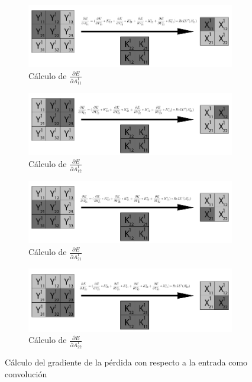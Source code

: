 \begin{figure}[H]
	\centering
	\begin{subfigure}{.5\textwidth}
		\hspace{-25mm}
		\includegraphics[width=1.4\linewidth]{imagenes/conv_back_entrada_pad_1.jpg}  
		\caption{Cálculo de $\frac{\partial E}{\partial A^1_{11}}$}
	\end{subfigure}%
	\begin{subfigure}{.5\textwidth}
		\hspace{5mm}
		\includegraphics[width=1.4\linewidth]{imagenes/conv_back_entrada_pad_2.jpg}  
		\caption{Cálculo de $\frac{\partial E}{\partial A^1_{12}}$}
	\end{subfigure}
	\vspace{5mm}
	\begin{subfigure}{.5\textwidth}
		\hspace{-25mm}
		\includegraphics[width=1.4\linewidth]{imagenes/conv_back_entrada_pad_3.jpg}  
		\caption{Cálculo de $\frac{\partial E}{\partial A^1_{21}}$}
	\end{subfigure}%
	\begin{subfigure}{.5\textwidth}
		\hspace{5mm}
		\includegraphics[width=1.4\linewidth]{imagenes/conv_back_entrada_pad_4.jpg}  
		\caption{Cálculo de $\frac{\partial E}{\partial A^1_{22}}$}
	\end{subfigure}
	\caption{Cálculo del gradiente de la pérdida con respecto a la entrada como convolución}
	\label{fig:conv_backprop_como_convolucion_Y_K_pad}
\end{figure}

